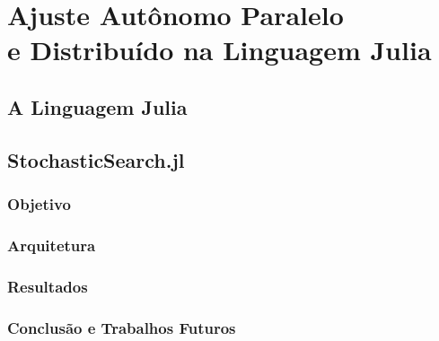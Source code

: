 \chapter[Ajuste Autônomo Paralelo e Distribuído]{Ajuste Autônomo Paralelo \\ e Distribuído na Linguagem Julia}
\label{chap:julia}

\section{A Linguagem Julia}
\label{sec:julia}

\section{StochasticSearch.jl}
\label{sec:ss}

\subsection{Objetivo}
\label{subsec:obj}

\subsection{Arquitetura}
\label{subsec:arch}

\subsection{Resultados}
\label{subsec:res}

\subsection{Conclusão e Trabalhos Futuros}
\label{subsec:concl}
